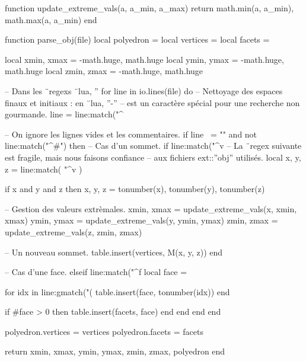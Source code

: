 \documentclass{standalone}
\begin{document}
\begin{luacode}
function update_extreme_vals(a, a_min, a_max)
  return math.min(a, a_min), math.max(a, a_min)
end

function parse_obj(file)
  local polyedron = {}
  local vertices  = {}
  local facets    = {}

  local xmin, xmax = -math.huge, math.huge
  local ymin, ymax = -math.huge, math.huge
  local zmin, zmax = -math.huge, math.huge

-- Dans les ¨regexs ¨lua, ''%
  for line in io.lines(file) do
-- Nettoyage des espaces finaux et initiaux : en ¨lua, ''-''
-- est un caractère spécial pour une recherche non gourmande.
    line = line:match("^%

-- On ignore les lignes vides et les commentaires.
    if line ~= "" and not line:match("^#") then
-- Cas d'un sommet.
      if line:match("^v%
-- La ¨regex suivante est fragile, mais nous faisons confiance
-- aux fichiers ext::''obj'' utilisés.
        local x, y, z = line:match(
          "^v%
        )

        if x and y and z then
          x, y, z = tonumber(x), tonumber(y), tonumber(z)

-- Gestion des valeurs extrèmales.
          xmin, xmax = update_extreme_vals(x, xmin, xmax)
          ymin, ymax = update_extreme_vals(y, ymin, ymax)
          zmin, zmax = update_extreme_vals(z, zmin, zmax)

-- Un nouveau sommet.
          table.insert(vertices, M(x, y, z))
        end

-- Cas d'une face.
      elseif line:match("^f%
        local face = {}

        for idx in line:gmatch("(%
          table.insert(face, tonumber(idx))
        end

        if #face > 0 then
          table.insert(facets, face)
        end
      end
    end
  end

  polyedron.vertices = vertices
  polyedron.facets   = facets

  return xmin, xmax, ymin, ymax, zmin, zmax, polyedron
end
\end{luacode}
\end{document}
